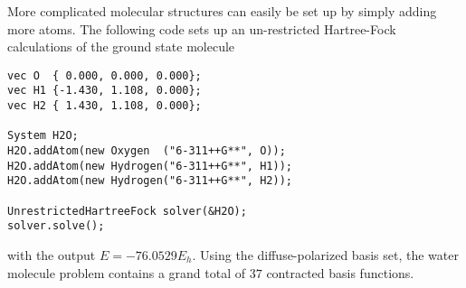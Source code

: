 \documentclass[../../master.tex]{subfiles}
\begin{document}
More complicated molecular structures can easily be set up by simply adding more atoms. The following code sets up an un-restricted Hartree-Fock calculations of the ground state  molecule
\begin{lstlisting}[language={[std]c++}]
vec O  { 0.000, 0.000, 0.000};
vec H1 {-1.430, 1.108, 0.000};
vec H2 { 1.430, 1.108, 0.000};

System H2O;
H2O.addAtom(new Oxygen  ("6-311++G**", O));
H2O.addAtom(new Hydrogen("6-311++G**", H1));
H2O.addAtom(new Hydrogen("6-311++G**", H2));

UnrestrictedHartreeFock solver(&H2O);
solver.solve();
\end{lstlisting}
with the output $E=-76.0529E_h$. Using the diffuse-polarized  basis set, the water molecule problem contains a grand total of $37$ contracted basis functions. 
\end{document}
